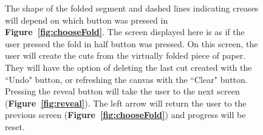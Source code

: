 \documentclass[11pt]{article}
\begin{document}
\begin{figure}
                \begin{minipage}[c]{0.65\textwidth}
                \caption{The shape of the folded segment and dashed lines indicating creases will depend on which button was pressed in \textbf{Figure~\ref{fig:chooseFold}}. The screen displayed here is as if the user pressed the fold in half button was pressed. On this screen, the user will create the cuts from the virtually folded piece of paper. They will have the option of deleting the last cut created with the ``Undo" button, or refreshing the canvas with the ``Clear" button. Pressing the reveal button will take the user to the next screen (\textbf{Figure~\ref{fig:reveal}}). The left arrow will return the user to the previous screen (\textbf{Figure~\ref{fig:chooseFold}}) and progress will be reset.}
                \label{fig:createPattern}
                \end{minipage}
            \end{figure}
            
\end{document}
